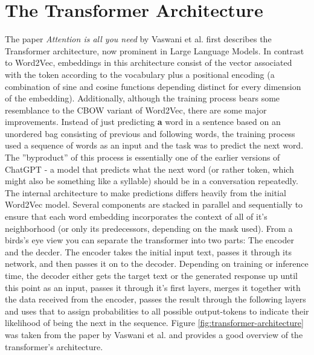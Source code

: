\documentclass[draft,final]{vutinfth} %
\begin{document}
\section{The Transformer Architecture}
The paper \textit{Attention is all you need} \cite{vaswani_attention_2017} by Vaswani et al. first describes the Transformer architecture, now prominent in Large Language Models. In contrast to Word2Vec, embeddings in this architecture consist of the vector associated with the token according to the vocabulary plus a positional encoding (a combination of sine and cosine functions depending distinct for every dimension of the embedding). Additionally, although the training process bears some resemblance to the CBOW variant of Word2Vec, there are some major improvements. Instead of just predicting \textbf{a} word in a sentence based on an unordered bag consisting of previous and following words, the training process used a sequence of words as an input and the task was to predict the next word. The ''byproduct'' of this process is essentially one of the earlier versions of ChatGPT - a model that predicts what the next word (or rather token, which might also be something like a syllable) should be in a conversation repeatedly. The internal architecture to make predictions differs heavily from the initial Word2Vec model. Several components are stacked in parallel and sequentially to ensure that each word embedding incorporates the context of all of it's neighborhood (or only its predecessors, depending on the mask used). From a birds's eye view you can separate the transformer into two parts: The encoder and the decder. The encoder takes the initial input text, passes it through its network, and then passes it on to the decoder. Depending on training or inference time, the decoder either gets the target text or the generated response up until this point as an input, passes it through it's first layers, merges it together with the data received from the encoder, passes the result through the following layers and uses that to assign probabilities to all possible output-tokens to indicate their likelihood of being the next in the sequence. Figure \ref{fig:transformer-architecture} was taken from the paper by Vaswani et al. and provides a good overview of the transformer's architecture. 
\end{document}
